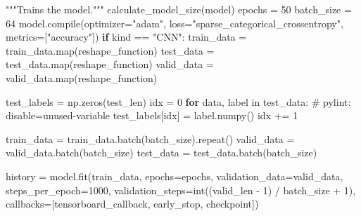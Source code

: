 \documentclass[
  9pt,
  letterpaper,
  abstract,
  titlepage]{scrbook}
\newenvironment{Shaded}{\begin{snugshade}}{\end{snugshade}}
\newcommand{\ControlFlowTok}[1]{\textcolor[rgb]{0.00,0.23,0.31}{\textbf{#1}}}
\newcommand{\DataTypeTok}[1]{\textcolor[rgb]{0.68,0.00,0.00}{#1}}
\newcommand{\DecValTok}[1]{\textcolor[rgb]{0.68,0.00,0.00}{#1}}
\newcommand{\NormalTok}[1]{\textcolor[rgb]{0.00,0.23,0.31}{#1}}
\newcommand{\OperatorTok}[1]{\textcolor[rgb]{0.37,0.37,0.37}{#1}}
\newcommand{\StringTok}[1]{\textcolor[rgb]{0.13,0.47,0.30}{#1}}
\begin{document}
\begin{Shaded}
\begin{Highlighting}[]
\StringTok{"""Trains the model."""}
\NormalTok{calculate\_model\_size}\OperatorTok{(}\NormalTok{model}\OperatorTok{)}
\NormalTok{epochs }\OperatorTok{=} \DecValTok{50}
\NormalTok{batch\_size }\OperatorTok{=} \DecValTok{64}
\NormalTok{model}\OperatorTok{.}\NormalTok{compile}\OperatorTok{(}\NormalTok{optimizer}\OperatorTok{=}\StringTok{"adam"}\OperatorTok{,}
\NormalTok{              loss}\OperatorTok{=}\StringTok{"sparse\_categorical\_crossentropy"}\OperatorTok{,}
\NormalTok{              metrics}\OperatorTok{=[}\StringTok{"accuracy"}\OperatorTok{])}
\ControlFlowTok{if}\NormalTok{ kind }\OperatorTok{==} \StringTok{"CNN"}\OperatorTok{:}
\NormalTok{    train\_data }\OperatorTok{=}\NormalTok{ train\_data}\OperatorTok{.}\NormalTok{map}\OperatorTok{(}\NormalTok{reshape\_function}\OperatorTok{)}
\NormalTok{    test\_data }\OperatorTok{=}\NormalTok{ test\_data}\OperatorTok{.}\NormalTok{map}\OperatorTok{(}\NormalTok{reshape\_function}\OperatorTok{)}
\NormalTok{    valid\_data }\OperatorTok{=}\NormalTok{ valid\_data}\OperatorTok{.}\NormalTok{map}\OperatorTok{(}\NormalTok{reshape\_function}\OperatorTok{)}

\NormalTok{test\_labels }\OperatorTok{=}\NormalTok{ np}\OperatorTok{.}\NormalTok{zeros}\OperatorTok{(}\NormalTok{test\_len}\OperatorTok{)}
\NormalTok{idx }\OperatorTok{=} \DecValTok{0}
\ControlFlowTok{for}\NormalTok{ data}\OperatorTok{,}\NormalTok{ label in test\_data}\OperatorTok{:}\NormalTok{  \# pylint}\OperatorTok{:}\NormalTok{ disable}\OperatorTok{=}\NormalTok{unused}\OperatorTok{{-}}\NormalTok{variable}
\NormalTok{    test\_labels}\OperatorTok{[}\NormalTok{idx}\OperatorTok{]} \OperatorTok{=}\NormalTok{ label}\OperatorTok{.}\NormalTok{numpy}\OperatorTok{()}
\NormalTok{    idx }\OperatorTok{+=} \DecValTok{1}

\NormalTok{train\_data }\OperatorTok{=}\NormalTok{ train\_data}\OperatorTok{.}\NormalTok{batch}\OperatorTok{(}\NormalTok{batch\_size}\OperatorTok{).}\NormalTok{repeat}\OperatorTok{()}
\NormalTok{valid\_data }\OperatorTok{=}\NormalTok{ valid\_data}\OperatorTok{.}\NormalTok{batch}\OperatorTok{(}\NormalTok{batch\_size}\OperatorTok{)}
\NormalTok{test\_data }\OperatorTok{=}\NormalTok{ test\_data}\OperatorTok{.}\NormalTok{batch}\OperatorTok{(}\NormalTok{batch\_size}\OperatorTok{)}

\NormalTok{history }\OperatorTok{=}\NormalTok{ model}\OperatorTok{.}\NormalTok{fit}\OperatorTok{(}\NormalTok{train\_data}\OperatorTok{,}
\NormalTok{              epochs}\OperatorTok{=}\NormalTok{epochs}\OperatorTok{,}
\NormalTok{              validation\_data}\OperatorTok{=}\NormalTok{valid\_data}\OperatorTok{,}
\NormalTok{              steps\_per\_epoch}\OperatorTok{=}\DecValTok{1000}\OperatorTok{,}
\NormalTok{              validation\_steps}\OperatorTok{=}\DataTypeTok{int}\OperatorTok{((}\NormalTok{valid\_len }\OperatorTok{{-}} \DecValTok{1}\OperatorTok{)} \OperatorTok{/}\NormalTok{ batch\_size }\OperatorTok{+} \DecValTok{1}\OperatorTok{),}
\NormalTok{              callbacks}\OperatorTok{=[}\NormalTok{tensorboard\_callback}\OperatorTok{,}\NormalTok{ early\_stop}\OperatorTok{,}\NormalTok{ checkpoint}\OperatorTok{])}


\end{Highlighting}
\end{Shaded}
\end{document}
